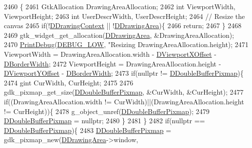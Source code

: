 \begin{DoxyCode}
2460                                      \{
2461     GtkAllocation DrawingAreaAllocation;
2462     \textcolor{keywordtype}{int} ViewportWidth, ViewportHeight;
2463     \textcolor{keywordtype}{int} UserDescrWidth, UserDescrHeight;
2464     \textcolor{comment}{// Resize the canvas}
2465     \textcolor{keywordflow}{if}(!\hyperlink{classCApplicationData_aa6c5bea9bdcc64398e5a3f693661d37c}{DDrawingContext} || !\hyperlink{classCApplicationData_a4735f5d31632313e0b2a1659eb178987}{DDrawingArea})\{
2466         \textcolor{keywordflow}{return};    
2467     \}
2468     
2469     gtk\_widget\_get\_allocation(\hyperlink{classCApplicationData_a4735f5d31632313e0b2a1659eb178987}{DDrawingArea}, &DrawingAreaAllocation);
2470     \hyperlink{Debug_8h_aa5f00f5537c9760f6ae1782460748ab9}{PrintDebug}(\hyperlink{Debug_8h_a3a5f3fc09784650d8388cb854882f840}{DEBUG\_LOW}, \textcolor{stringliteral}{"Resizing %
      DrawingAreaAllocation.height);
2471     ViewportWidth = DrawingAreaAllocation.width - \hyperlink{classCApplicationData_a306bba873ccc47126111305fe21ef3ff}{DViewportXOffset} - 
      \hyperlink{classCApplicationData_a566b69c72fa982c6ecf8e47dc21df489}{DBorderWidth};
2472     ViewportHeight = DrawingAreaAllocation.height - \hyperlink{classCApplicationData_afc58ed96a1af813b28f6abf2c7d2dc72}{DViewportYOffset} - 
      \hyperlink{classCApplicationData_a566b69c72fa982c6ecf8e47dc21df489}{DBorderWidth};
2473     \textcolor{keywordflow}{if}(\textcolor{keyword}{nullptr} != \hyperlink{classCApplicationData_aefb64ec5ca3f791f6d431cfc56b9f3b3}{DDoubleBufferPixmap})\{
2474         gint CurWidth, CurHeight;
2475         
2476         gdk\_pixmap\_get\_size(\hyperlink{classCApplicationData_aefb64ec5ca3f791f6d431cfc56b9f3b3}{DDoubleBufferPixmap}, &CurWidth, &CurHeight); 
2477         \textcolor{keywordflow}{if}((DrawingAreaAllocation.width != CurWidth)||(DrawingAreaAllocation.height != CurHeight))\{
2478             g\_object\_unref(\hyperlink{classCApplicationData_aefb64ec5ca3f791f6d431cfc56b9f3b3}{DDoubleBufferPixmap});
2479             \hyperlink{classCApplicationData_aefb64ec5ca3f791f6d431cfc56b9f3b3}{DDoubleBufferPixmap} = \textcolor{keyword}{nullptr};
2480         \}
2481     \}
2482     \textcolor{keywordflow}{if}(\textcolor{keyword}{nullptr} == \hyperlink{classCApplicationData_aefb64ec5ca3f791f6d431cfc56b9f3b3}{DDoubleBufferPixmap})\{
2483         \hyperlink{classCApplicationData_aefb64ec5ca3f791f6d431cfc56b9f3b3}{DDoubleBufferPixmap} = gdk\_pixmap\_new(\hyperlink{classCApplicationData_a4735f5d31632313e0b2a1659eb178987}{DDrawingArea}->window, 
}
\end{DoxyCode}
